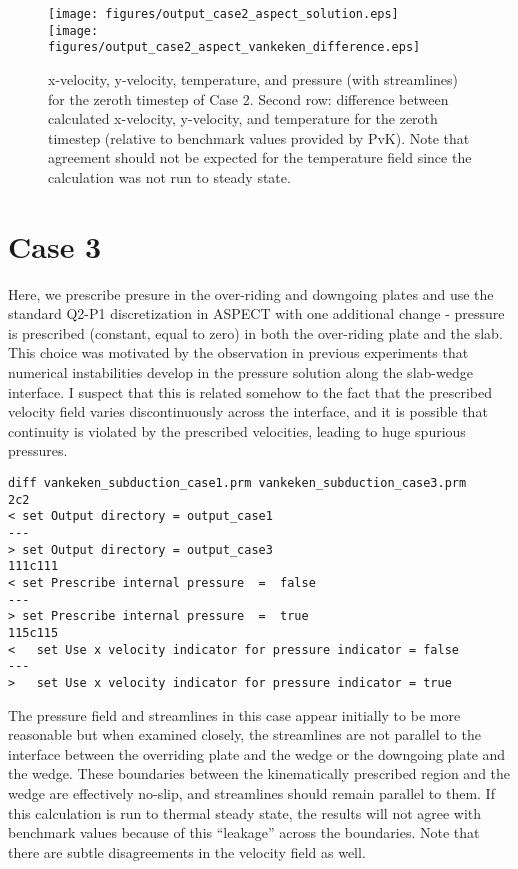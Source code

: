 \documentclass[11pt,letterpaper]{article}
\begin{document}
\begin{figure}
\texttt{[image: figures/output\_case2\_aspect\_solution.eps]}\\
\texttt{[image: figures/output\_case2\_aspect\_vankeken\_difference.eps]}
\caption{x-velocity, y-velocity, temperature, and pressure (with streamlines) for the zeroth timestep of Case 2. Second row: difference between calculated x-velocity, y-velocity, and temperature for the zeroth timestep (relative to benchmark values provided by PvK). Note that agreement should not be expected for the temperature field since the calculation was not run to steady state.}
\end{figure}

\section{Case 3}
Here, we prescribe presure in the over-riding and downgoing plates and use the standard Q2-P1 discretization in ASPECT with one additional change - pressure is prescribed (constant, equal to zero) in both the over-riding plate and the slab. This choice was motivated by the observation in previous experiments that numerical instabilities develop in the pressure solution along the slab-wedge interface. I suspect that this is related somehow to the fact that the prescribed velocity field varies discontinuously across the interface, and it is possible that continuity is violated by the prescribed velocities, leading to huge spurious pressures. 
\begin{verbatim}
diff vankeken_subduction_case1.prm vankeken_subduction_case3.prm
2c2
< set Output directory = output_case1
---
> set Output directory = output_case3
111c111
< set Prescribe internal pressure  =  false
---
> set Prescribe internal pressure  =  true
115c115
<   set Use x velocity indicator for pressure indicator = false
---
>   set Use x velocity indicator for pressure indicator = true
\end{verbatim}

The pressure field and streamlines in this case appear initially to be more reasonable but when examined closely, the streamlines are not parallel to the interface between the overriding plate and the wedge or the downgoing plate and the wedge. These boundaries between the kinematically prescribed region and the wedge are effectively no-slip, and streamlines should remain parallel to them. If this calculation is run to thermal steady state, the results will not agree with benchmark values because of this ``leakage'' across the boundaries. Note that there are subtle disagreements in the velocity field as  well.
\end{document}
